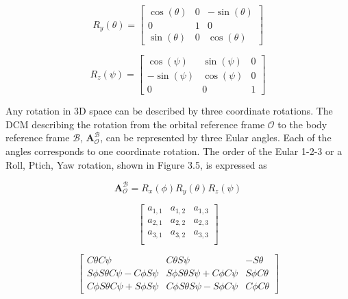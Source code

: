\begin{equation}
    R_y(\theta) = \begin{bmatrix} 
        \cos(\theta) & 0 & -\sin(\theta) \\
        0 & 1 & 0 \\
        \sin(\theta) & 0  & \cos(\theta)
    \end{bmatrix}
    \label{Eq:3.2}
\end{equation}

\begin{equation}
    R_z(\psi) = \begin{bmatrix} 
        \cos(\psi) & \sin(\psi) & 0 \\
        -\sin(\psi) & \cos(\psi) & 0 \\
        0 & 0 & 1
    \end{bmatrix}
    \label{Eq:3.3}
\end{equation}

\noindent Any rotation in 3D space can be described by three coordinate rotations. The DCM describing the rotation from 
the orbital reference frame $\mathcal{O}$ to the body reference frame $\mathcal{B}$, $\mathbf{A}_{\mathcal{O}}^{\mathcal{B}}$, 
can be represented by three Eular angles. Each of the angles corresponds to one coordinate rotation. The order
of the Eular 1-2-3 or a Roll, Ptich, Yaw rotation, shown in Figure 3.5, is expressed as

\begin{equation}
    \boldsymbol{A}_{\mathcal{O}}^{\mathcal{B}} = R_x(\phi)R_y(\theta)R_z(\psi)
    \label{Eq:3.4}
\end{equation}

\begin{equation}
    \begin{bmatrix}
        a_{1,1} & a_{1,2} & a_{1,3}\\
        a_{2,1} & a_{2,2} & a_{2,3}\\
        a_{3,1} & a_{3,2} & a_{3,3}\\
    \end{bmatrix}
\end{equation}

\begin{equation}
    \begin{bmatrix}
        C\theta C\psi & C\theta S\psi &  -S\theta\\
        S\phi S\theta C\psi - C\phi S\psi & S\phi S\theta S\psi + C\phi C\psi & S\phi C\theta\\
        C\phi S\theta C\psi + S\phi S\psi &  C\phi S\theta S\psi - S\phi C\psi & C\phi C\theta
    \end{bmatrix}
\end{equation}


